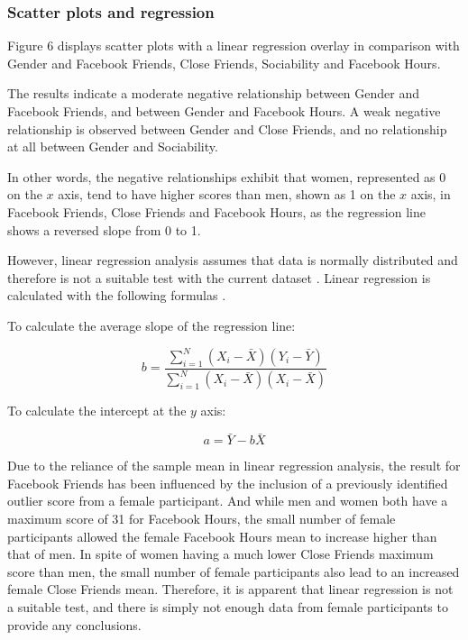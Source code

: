
\subsubsection{Scatter plots and regression}

Figure 6 displays scatter plots with a linear regression overlay in comparison with Gender and Facebook Friends, Close Friends, Sociability and Facebook Hours.

The results indicate a moderate negative relationship between Gender and Facebook Friends, and between Gender and Facebook Hours. A weak negative relationship is observed between Gender and Close Friends, and no relationship at all between Gender and Sociability.

In other words, the negative relationships exhibit that women, represented as 0 on the $x$ axis, tend to have higher scores than men, shown as 1 on the $x$ axis, in Facebook Friends, Close Friends and Facebook Hours, as the regression line shows a reversed slope from 0 to 1.

However, linear regression analysis assumes that data is normally distributed and therefore is not a suitable test with the current dataset \citep[p. 263]{McKillup2011}. Linear regression is calculated with the following formulas \citep[p. 247-249]{McKillup2011}.\\
\linebreak

To calculate the average slope of the regression line:
 
$$b = \frac{\sum_{i=1}^N(X_i - \bar{X})(Y_i - \bar{Y})}{\sum_{i=1}^N(X_i - \bar{X})(X_i - \bar{X})}$$ \linebreak

To calculate the intercept at the $y$ axis:

$$a = \bar{Y} - b\bar{X}$$ \linebreak

Due to the reliance of the sample mean in linear regression analysis, the result for Facebook Friends has been influenced by the inclusion of a previously identified outlier score from a female participant. And while men and women both have a maximum score of 31 for Facebook Hours, the small number of female participants allowed the female Facebook Hours mean to increase higher than that of men. In spite of women having a much lower Close Friends maximum score than men, the small number of female participants also lead to an increased female Close Friends mean. Therefore, it is apparent that linear regression is not a suitable test, and there is simply not enough data from female participants to provide any conclusions.


